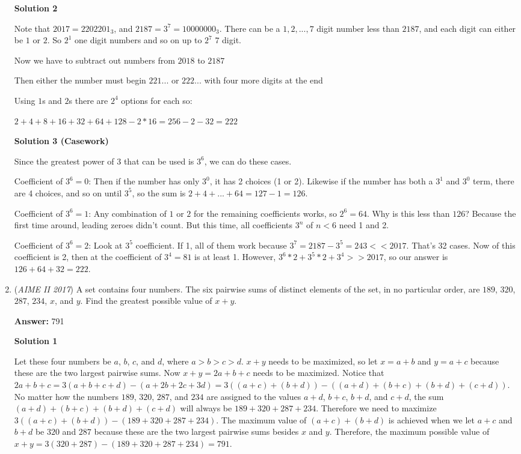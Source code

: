 \begin{enumerate}
 



\textbf{Solution 2}

Note that $2017=2202201_{3}$, and $2187=3^7=10000000_{3}$. There can be a $1,2,...,7$ digit number less than $2187$, and each digit can either be $1$ or $2$. So $2^1$ one digit numbers and so on up to $2^7$ $7$ digit.

 
Now we have to subtract out numbers from $2018$ to $2187$

 Then either the number must begin $221...$ or $222...$ with  four more digits at the end

 Using $1$s and $2$s there are $2^4$ options for each so:

 $2+4+8+16+32+64+128-2*16=256-2-32=\boxed{222}$




\textbf{Solution 3 (Casework)}

Since the greatest power of $3$ that can be used is $3^6$, we can do these cases.

 Coefficient of $3^6=0$: Then if the number has only $3^0$, it has 2 choices (1 or 2). Likewise if the number has both a $3^1$ and $3^0$ term, there are 4 choices, and so on until $3^5$, so the sum is $2+4+...+64=127-1=126$.

 Coefficient of $3^6=1$: Any combination of $1$ or $2$ for the remaining coefficients works, so $2^6=64$. Why is this less than $126$? Because the first time around, leading zeroes didn't count. But this time, all coefficients $3^n$ of $n<6$ need 1 and 2.

 Coefficient of $3^6=2$: Look at $3^5$ coefficient. If 1, all of them work because $3^7=2187-3^5=243<<2017$. That's 32 cases. Now of this coefficient is 2, then at the coefficient of $3^4=81$ is at least 1. However, $3^6*2+3^5*2+3^4>>2017$, so our answer is $126+64+32=\boxed{222}$.

 


	\item (\textit{AIME II 2017}) A set contains four numbers. The six pairwise sums of distinct elements of the set, in no particular order, are $189$, $320$, $287$, $234$, $x$, and $y$. Find the greatest possible value of $x+y$.


 
 \textbf{Answer: }791



\textbf{Solution 1}

Let these four numbers be $a$, $b$, $c$, and $d$, where $a>b>c>d$. $x+y$ needs to be maximized, so let $x=a+b$ and $y=a+c$ because these are the two largest pairwise sums. Now $x+y=2a+b+c$ needs to be maximized. Notice that $2a+b+c=3(a+b+c+d)-(a+2b+2c+3d)=3((a+c)+(b+d))-((a+d)+(b+c)+(b+d)+(c+d))$. No matter how the numbers $189$, $320$, $287$, and $234$ are assigned to the values $a+d$, $b+c$, $b+d$, and $c+d$, the sum $(a+d)+(b+c)+(b+d)+(c+d)$ will always be $189+320+287+234$. Therefore we need to maximize $3((a+c)+(b+d))-(189+320+287+234)$. The maximum value of $(a+c)+(b+d)$ is achieved when we let $a+c$ and $b+d$ be $320$ and $287$ because these are the two largest pairwise sums besides $x$ and $y$. Therefore, the maximum possible value of $x+y=3(320+287)-(189+320+287+234)=\boxed{791}$.


\end{enumerate}
